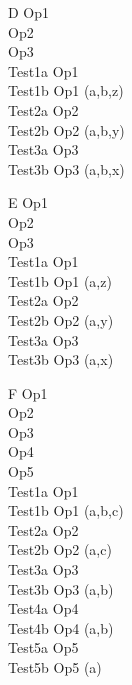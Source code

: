 \begin{class}{D}
  Op1 \\
  Op2 \\
  Op3 \\
  Test1a \sdef Op1 \\
  Test1b \sdef Op1 \hide (a,b,z)\\
  Test2a \sdef Op2 \\
  Test2b \sdef Op2 \hide (a,b,y)\\
  Test3a \sdef Op3 \\
  Test3b \sdef Op3 \hide (a,b,x)\\
\end{class}

\begin{class}{E}
  Op1 \\
  Op2 \\
  Op3 \\
  Test1a \sdef Op1 \\
  Test1b \sdef Op1 \hide (a,z)\\
  Test2a \sdef Op2 \\
  Test2b \sdef Op2 \hide (a,y)\\
  Test3a \sdef Op3 \\
  Test3b \sdef Op3 \hide (a,x)\\
\end{class}

\begin{class}{F}
  Op1 \\
  Op2 \\
  Op3 \\
  Op4 \\
  Op5 \\
  Test1a \sdef Op1 \\
  Test1b \sdef Op1 \hide (a,b,c)\\
  Test2a \sdef Op2 \\
  Test2b \sdef Op2 \hide (a,c)\\
  Test3a \sdef Op3 \\
  Test3b \sdef Op3 \hide (a,b)\\
  Test4a \sdef Op4 \\
  Test4b \sdef Op4 \hide (a,b)\\
  Test5a \sdef Op5 \\
  Test5b \sdef Op5 \hide (a)\\
\end{class}
